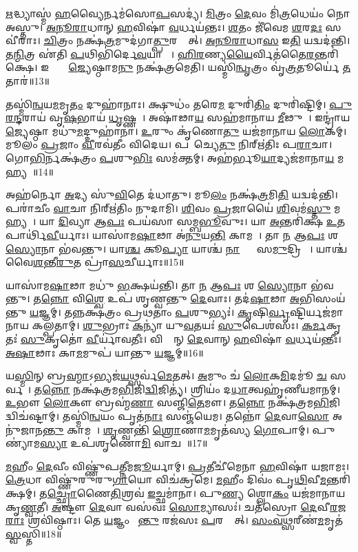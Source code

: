 \ul{𑌋}𑌦𑍍𑌧𑍍𑌯𑌾𑌸𑍍𑌮॑ \ul{𑌹}𑌵𑍍𑌯𑍈𑌰𑍍𑌨𑌮॑𑌸𑍋\ul{𑌪}𑌸𑌦𑍍𑌯॑।
\ul{𑌮𑌿}𑌤𑍍𑌰𑌂 \ul{𑌦𑍇}𑌵𑌂 𑌮𑌿॑\ul{𑌤𑍍𑌰}𑌧𑍇𑌯𑌂॑ 𑌨𑍋 𑌅𑌸𑍍𑌤𑍁।
\ul{𑌅}\ul{𑌨𑍂}\ul{𑌰𑌾}𑌧𑌾𑌨𑍍 \ul{𑌹}𑌵𑌿𑌷𑌾॑ \ul{𑌵}𑌰𑍍𑌧𑌯॑𑌨𑍍𑌤𑌃।
\ul{𑌶}𑌤𑌂 𑌜𑍀॑𑌵𑍇𑌮 \ul{𑌶}𑌰\ul{𑌦𑌃} 𑌸𑌵𑍀॑𑌰𑌾𑌃।
\ul{𑌚𑌿}𑌤𑍍𑌰𑌂 𑌨𑌕𑍍𑌷॑\ul{𑌤𑍍𑌰}𑌮𑍁𑌦॑𑌗𑌾\ul{𑌤𑍍𑌪𑍁}𑌰𑌸𑍍𑌤𑌾᳚𑌤𑍍।
\ul{𑌅}\ul{𑌨𑍂}\ul{𑌰𑌾}𑌧𑌾\ul{𑌸} 𑌇\ul{𑌤𑌿} 𑌯𑌦𑍍𑌵𑌦॑𑌨𑍍𑌤𑌿।
𑌤\ul{𑌨𑍍𑌮𑌿}𑌤𑍍𑌰 𑌏॑𑌤𑌿 \ul{𑌪}𑌥𑌿𑌭𑌿॑𑌰𑍍𑌦𑍇\ul{𑌵}𑌯𑌾𑌨𑍈𑌃᳚।
\ul{𑌹𑌿}\ul{𑌰}𑌣𑍍𑌯\ul{𑌯𑍈}𑌰𑍍𑌵𑌿𑌤॑𑌤𑍈\-\ul{𑌰}𑌨𑍍𑌤𑌰𑌿॑𑌕𑍍𑌷𑍇।
𑌇𑌨𑍍𑌦𑍍𑌰𑍋᳚ \ul{𑌜𑍍𑌯𑍇}𑌷𑍍𑌠𑌾𑌮\ul{𑌨𑍁} 𑌨𑌕𑍍𑌷॑𑌤𑍍𑌰𑌮𑍇𑌤𑌿।
𑌯𑌸𑍍𑌮𑌿॑\ul{𑌨𑍍𑌵𑍃}𑌤𑍍𑌰𑌂 𑌵𑍃॑\ul{𑌤𑍍𑌰}𑌤𑍂𑌰𑍍𑌯𑍇॑ \ul{𑌤}𑌤𑌾𑌰॑॥13॥

𑌤𑌸𑍍𑌮𑌿॑\ul{𑌨𑍍𑌵}𑌯\ul{𑌮}𑌮𑍃\ul{𑌤𑌂} 𑌦𑍁𑌹𑌾॑𑌨𑌾𑌃।
𑌕𑍍𑌷𑍁𑌧𑌂॑ 𑌤𑌰𑍇\ul{𑌮} 𑌦𑍁𑌰𑌿॑\ul{𑌤𑌿𑌂} 𑌦𑍁𑌰𑌿॑𑌷𑍍𑌟𑌿𑌮𑍍।
\ul{𑌪𑍁}\ul{𑌰}\ul{𑌨𑍍𑌦}𑌰𑌾𑌯॑ 𑌵𑍃\ul{𑌷}𑌭𑌾𑌯॑ \ul{𑌧𑍃}𑌷𑍍𑌣𑌵𑍇᳚।
𑌅𑌷𑌾॑𑌢𑌾\ul{𑌯} 𑌸𑌹॑𑌮𑌾𑌨𑌾𑌯 \ul{𑌮𑍀}𑌢𑍁𑌷𑍇᳚।
𑌇𑌨𑍍𑌦𑍍𑌰𑌾॑𑌯 \ul{𑌜𑍍𑌯𑍇}𑌷𑍍𑌠𑌾 𑌮𑌧𑍁॑\ul{𑌮}𑌦𑍍𑌦𑍁𑌹𑌾॑𑌨𑌾।
\ul{𑌉}𑌰𑍁𑌂 𑌕𑍃॑𑌣𑍋\ul{𑌤𑍁} 𑌯𑌜॑𑌮𑌾𑌨𑌾𑌯 \ul{𑌲𑍋}𑌕𑌮𑍍।
𑌮𑍂𑌲𑌂॑ \ul{𑌪𑍍𑌰}𑌜𑌾𑌂 \ul{𑌵𑍀}𑌰𑌵॑𑌤𑍀𑌂 𑌵𑌿𑌦𑍇𑌯।
𑌪𑌰𑌾᳚𑌚𑍍𑌯𑍇\ul{𑌤𑍁} 𑌨𑌿𑌰𑍍\mbox{}𑌋॑𑌤𑌿𑌃 𑌪\ul{𑌰𑌾}𑌚𑌾।
𑌗𑍋\ul{𑌭𑌿}𑌰𑍍𑌨𑌕𑍍𑌷॑𑌤𑍍𑌰𑌂 \ul{𑌪}𑌶𑍁\ul{𑌭𑌿𑌃} 𑌸𑌮॑𑌕𑍍𑌤𑌮𑍍।
𑌅𑌹॑𑌰𑍍𑌭𑍂\ul{𑌯𑌾}𑌦𑍍𑌯𑌜॑𑌮𑌾𑌨𑌾\ul{𑌯} 𑌮𑌹𑍍𑌯𑌮𑍍᳚॥14॥

𑌅𑌹॑𑌰𑍍𑌨𑍋 \ul{𑌅}𑌦𑍍𑌯 𑌸𑍁॑\ul{𑌵𑌿}𑌤𑍇 𑌦॑𑌧𑌾𑌤𑍁।
𑌮𑍂\ul{𑌲𑌂} 𑌨𑌕𑍍𑌷॑\ul{𑌤𑍍𑌰}𑌮𑌿\ul{𑌤𑌿} 𑌯𑌦𑍍𑌵𑌦॑𑌨𑍍𑌤𑌿।
𑌪𑌰𑌾॑𑌚𑍀𑌂 \ul{𑌵𑌾}𑌚𑌾 𑌨𑌿𑌰𑍍\mbox{}𑌋॑𑌤𑌿𑌂 𑌨𑍁𑌦𑌾𑌮𑌿।
\ul{𑌶𑌿}𑌵𑌂 \ul{𑌪𑍍𑌰}𑌜𑌾𑌯𑍈॑ \ul{𑌶𑌿}𑌵𑌮॑\ul{𑌸𑍍𑌤𑍁} 𑌮𑌹𑍍𑌯𑌮𑍍᳚।
𑌯𑌾 \ul{𑌦𑌿}𑌵𑍍𑌯𑌾 𑌆\ul{𑌪𑌃} 𑌪𑌯॑𑌸𑌾 𑌸𑌮𑍍𑌬\ul{𑌭𑍂}𑌵𑍁𑌃।
𑌯𑌾 \ul{𑌅}𑌨𑍍𑌤𑌰𑌿॑𑌕𑍍𑌷 \ul{𑌉}𑌤 𑌪𑌾𑌰𑍍𑌥𑌿॑\ul{𑌵𑍀}𑌰𑍍𑌯𑌾𑌃।
𑌯𑌾𑌸𑌾॑𑌮\ul{𑌷𑌾}𑌢𑌾 𑌅॑\ul{𑌨𑍁}𑌯\ul{𑌨𑍍𑌤𑌿} 𑌕𑌾𑌮𑌮𑍍᳚।
𑌤𑌾 \ul{𑌨} 𑌆\ul{𑌪𑌃} 𑌶 \ul{𑌸𑍍𑌯𑍋}𑌨𑌾 𑌭॑𑌵𑌨𑍍𑌤𑍁।
𑌯𑌾\ul{𑌶𑍍𑌚} 𑌕𑍂\ul{𑌪𑍍𑌯𑌾} 𑌯𑌾𑌶𑍍𑌚॑ \ul{𑌨𑌾}𑌦𑍍𑌯𑌾𑌃᳚ 𑌸\ul{𑌮𑍁}𑌦𑍍𑌰𑌿𑌯𑌾𑌃᳚।
𑌯𑌾𑌶𑍍𑌚॑ 𑌵𑍈\ul{𑌶}𑌨𑍍𑌤𑍀\ul{𑌰𑍁}𑌤 𑌪𑍍𑌰𑌾॑\ul{𑌸}𑌚𑍀𑌰𑍍𑌯𑌾𑌃॥15॥

𑌯𑌾𑌸𑌾॑𑌮\ul{𑌷𑌾}𑌢𑌾 𑌮𑌧𑍁॑ \ul{𑌭}𑌕𑍍𑌷𑌯॑𑌨𑍍𑌤𑌿।
𑌤𑌾 \ul{𑌨} 𑌆\ul{𑌪𑌃} 𑌶 \ul{𑌸𑍍𑌯𑍋}𑌨𑌾 𑌭॑𑌵𑌨𑍍𑌤𑍁।
𑌤\ul{𑌨𑍍𑌨𑍋} 𑌵𑌿\ul{𑌶𑍍𑌵𑍇} 𑌉𑌪॑ 𑌶𑍃𑌣𑍍𑌵𑌨𑍍𑌤𑍁 \ul{𑌦𑍇}𑌵𑌾𑌃।
𑌤𑌦॑\ul{𑌷𑌾}𑌢𑌾 \ul{𑌅}𑌭𑌿𑌸𑌂𑌯॑𑌨𑍍𑌤𑍁 \ul{𑌯}𑌜𑍍𑌞𑌮𑍍।
𑌤𑌨𑍍𑌨𑌕𑍍𑌷॑𑌤𑍍𑌰𑌂 𑌪𑍍𑌰𑌥𑌤𑌾𑌂 \ul{𑌪}𑌶𑍁𑌭𑍍𑌯𑌃॑।
\ul{𑌕𑍃}𑌷𑌿\ul{𑌰𑍍𑌵𑍃}𑌷𑍍𑌟𑌿𑌰𑍍𑌯𑌜॑𑌮𑌾𑌨𑌾𑌯 𑌕𑌲𑍍𑌪𑌤𑌾𑌮𑍍।
\ul{𑌶𑍁}𑌭𑍍𑌰𑌾𑌃 \ul{𑌕}𑌨𑍍𑌯𑌾॑ 𑌯𑍁\ul{𑌵}𑌤𑌯𑌃॑ \ul{𑌸𑍁}𑌪𑍇𑌶॑𑌸𑌃।
\ul{𑌕}\ul{𑌰𑍍𑌮}𑌕𑍃𑌤𑌃॑ \ul{𑌸𑍁}𑌕𑍃𑌤𑍋॑ \ul{𑌵𑍀}𑌰𑍍𑌯𑌾॑𑌵𑌤𑍀𑌃।
𑌵𑌿𑌶𑍍𑌵𑌾᳚𑌨𑍍 \ul{𑌦𑍇}𑌵𑌾𑌨𑍍 \ul{𑌹}𑌵𑌿𑌷𑌾॑ \ul{𑌵}𑌰𑍍𑌧𑌯॑𑌨𑍍𑌤𑍀𑌃।
\ul{𑌅}\ul{𑌷𑌾}𑌢𑌾𑌃 𑌕𑌾\ul{𑌮}𑌮𑍁𑌪॑ 𑌯𑌾𑌨𑍍𑌤𑍁 \ul{𑌯}𑌜𑍍𑌞𑌮𑍍॥16॥

𑌯\ul{𑌸𑍍𑌮𑌿}𑌨𑍍 𑌬𑍍𑌰\ul{𑌹𑍍𑌮𑌾}\-𑌽𑌭𑍍𑌯𑌜॑\ul{𑌯}𑌥𑍍𑌸𑌰𑍍𑌵॑\ul{𑌮𑍇}𑌤𑌤𑍍।
\ul{𑌅}𑌮𑍁𑌂 𑌚॑ \ul{𑌲𑍋}𑌕\ul{𑌮𑌿}𑌦𑌮𑍂॑ \ul{𑌚} 𑌸𑌰𑍍𑌵𑌮𑍍᳚।
𑌤\ul{𑌨𑍍𑌨𑍋} 𑌨𑌕𑍍𑌷॑𑌤𑍍𑌰𑌮\ul{𑌭𑌿}𑌜𑌿\ul{𑌦𑍍𑌵𑌿}𑌜𑌿𑌤𑍍𑌯॑।
𑌶𑍍𑌰𑌿𑌯𑌂॑ 𑌦\ul{𑌧𑌾}𑌤𑍍𑌵𑌹𑍃॑𑌣𑍀𑌯\-𑌮𑌾𑌨𑌮𑍍।
\ul{𑌉}𑌭𑍗 \ul{𑌲𑍋}𑌕𑍗 𑌬𑍍𑌰𑌹𑍍𑌮॑\ul{𑌣𑌾} 𑌸𑌞𑍍𑌜𑌿॑\ul{𑌤𑍇}𑌮𑍗।
𑌤\ul{𑌨𑍍𑌨𑍋} 𑌨𑌕𑍍𑌷॑𑌤𑍍𑌰𑌮\ul{𑌭𑌿}𑌜𑌿𑌦𑍍𑌵𑌿𑌚॑𑌷𑍍𑌟𑌾𑌮𑍍।
𑌤𑌸𑍍𑌮𑌿॑\ul{𑌨𑍍𑌵}𑌯𑌂 𑌪𑍃𑌤॑\ul{𑌨𑌾𑌃} 𑌸𑌞𑍍𑌜॑𑌯𑍇𑌮।
𑌤𑌨𑍍𑌨𑍋॑ \ul{𑌦𑍇}𑌵𑌾\ul{𑌸𑍋} 𑌅𑌨𑍁॑𑌜𑌾𑌨\ul{𑌨𑍍𑌤𑍁} 𑌕𑌾𑌮𑌮𑍍᳚।
\ul{𑌶𑍃}𑌣𑍍𑌵𑌨𑍍𑌤𑌿॑ \ul{𑌶𑍍𑌰𑍋}𑌣𑌾\ul{𑌮}𑌮𑍃𑌤॑𑌸𑍍𑌯 \ul{𑌗𑍋}𑌪𑌾𑌮𑍍।
𑌪𑍁𑌣𑍍𑌯𑌾॑𑌮\ul{𑌸𑍍𑌯𑌾} 𑌉𑌪॑𑌶𑍃𑌣𑍋\ul{𑌮𑌿} 𑌵𑌾𑌚𑌮𑍍᳚॥17॥


\ul{𑌮}𑌹𑍀𑌂 \ul{𑌦𑍇}𑌵𑍀𑌂 𑌵𑌿𑌷𑍍𑌣𑍁॑𑌪𑌤𑍍𑌨𑍀𑌮\ul{𑌜𑍂}𑌰𑍍𑌯𑌾𑌮𑍍।
\ul{𑌪𑍍𑌰}𑌤𑍀𑌚𑍀॑𑌮𑍇𑌨𑌾 \ul{𑌹}𑌵𑌿𑌷𑌾॑ 𑌯𑌜𑌾𑌮𑌃।
\ul{𑌤𑍍𑌰𑍇}𑌧𑌾 𑌵𑌿𑌷𑍍𑌣𑍁॑𑌰𑍁𑌰𑍁\ul{𑌗𑌾}𑌯𑍋 𑌵𑌿𑌚॑𑌕𑍍𑌰𑌮𑍇।
\ul{𑌮}𑌹𑍀𑌂 𑌦𑌿𑌵𑌂॑ 𑌪𑍃\ul{𑌥𑌿}𑌵𑍀\ul{𑌮}𑌨𑍍𑌤𑌰𑌿॑𑌕𑍍𑌷𑌮𑍍।
𑌤\ul{𑌚𑍍𑌛𑍍𑌰𑍋}𑌣𑍈\ul{𑌤𑌿}𑌶𑍍𑌰𑌵॑ \ul{𑌇}𑌚𑍍𑌛𑌮𑌾॑𑌨𑌾।
𑌪𑍁\ul{𑌣𑍍𑌯}\ul{} 𑌶𑍍𑌲𑍋\ul{𑌕𑌂} 𑌯𑌜॑𑌮𑌾𑌨𑌾𑌯 𑌕𑍃\ul{𑌣𑍍𑌵}𑌤𑍀।
\ul{𑌅}𑌷𑍍𑌟𑍗 \ul{𑌦𑍇}𑌵𑌾 𑌵𑌸॑𑌵𑌃 \ul{𑌸𑍋}𑌮𑍍𑌯𑌾𑌸𑌃॑।
𑌚𑌤॑𑌸𑍍𑌰𑍋 \ul{𑌦𑍇}𑌵𑍀\ul{𑌰}𑌜\ul{𑌰𑌾𑌃} 𑌶𑍍𑌰𑌵𑌿॑𑌷𑍍𑌠𑌾𑌃।
𑌤𑍇 \ul{𑌯}𑌜𑍍𑌞𑌂 𑌪𑌾᳚\ul{𑌨𑍍𑌤𑍁} 𑌰𑌜॑𑌸𑌃 \ul{𑌪}𑌰𑌸𑍍𑌤𑌾᳚𑌤𑍍।
\ul{𑌸𑌂}\ul{𑌵}\ul{𑌥𑍍𑌸}𑌰𑍀𑌣॑\ul{𑌮}𑌮𑍃𑌤॑ \ul{𑌸𑍍𑌵}𑌸𑍍𑌤𑌿॥18॥

